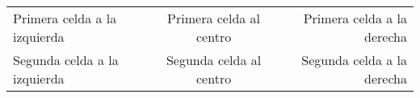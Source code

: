 \begin{tabular}{|l|c|r|}
Primera celda a la izquierda 
& Primera celda al centro 
& Primera celda a la derecha \\
Segunda celda a la izquierda
& Segunda celda al centro 
& Segunda celda a la derecha \\
\end{tabular}
